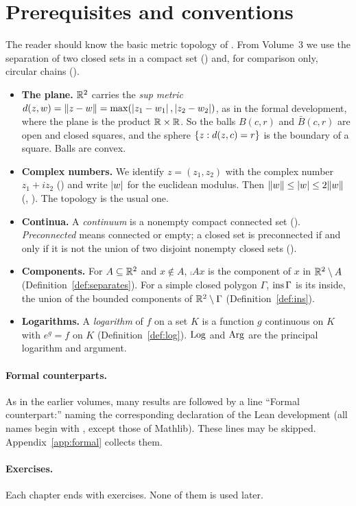 \section{Prerequisites and conventions}\label{sec:intro-conv}

The reader should know the basic metric topology of . From Volume~3 we use the
separation of two closed sets in a compact set () and, for comparison only,
circular chains ().

\begin{itemize}
\item \textbf{The plane.} $\mathbb{R}^2$ carries the \emph{sup metric}
$d(z,w)=\lVert z-w\rVert=\max(\left\lvert z_1-w_1\right\rvert,\left\lvert z_2-w_2\right\rvert)$, as in the formal development, where the plane is
the product $\mathbb{R}\times\mathbb{R}$. So the balls $B(c,r)$ and $\bar B(c,r)$ are open and closed squares, and the
sphere $\left\{ z:d(z,c)=r \right\}$ is the boundary of a square. Balls are convex.
\item \textbf{Complex numbers.} We identify $z=(z_1,z_2)$ with the complex number $z_1+iz_2$
() and write $\left\lvert w\right\rvert$ for the euclidean modulus. Then
$\lVert w\rVert\le\left\lvert w\right\rvert\le2\lVert w\rVert$ (,
). The topology is the usual one.
\item \textbf{Continua.} A \emph{continuum} is a nonempty compact connected set
(). \emph{Preconnected} means connected or empty; a closed set is
preconnected if and only if it is not the union of two disjoint nonempty closed sets
().
\item \textbf{Components.} For $A\subseteq\mathbb{R}^2$ and $x\notin A$, $\comp Ax$ is the component of $x$ in
$\mathbb{R}^2\setminus A$ (Definition~\ref{def:separates}). For a simple closed polygon $\Gamma$, $\operatorname{ins}\Gamma$ is
its inside, the union of the bounded components of $\mathbb{R}^2\setminus\Gamma$
(Definition~\ref{def:ins}).
\item \textbf{Logarithms.} A \emph{logarithm} of $f$ on a set $K$ is a function $g$ continuous on $K$
with $e^{g}=f$ on $K$ (Definition~\ref{def:log}). $\operatorname{Log}$ and $\operatorname{Arg}$ are the principal logarithm and
argument.
\end{itemize}

\paragraph{Formal counterparts.} As in the earlier volumes, many results are followed by a line
``Formal counterpart:'' naming the corresponding declaration of the Lean development (all names
begin with , except those of Mathlib). These lines may be skipped.
Appendix~\ref{app:formal} collects them.

\paragraph{Exercises.} Each chapter ends with exercises. None of them is used later.
